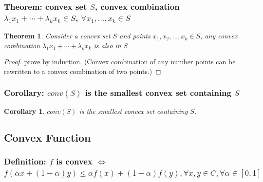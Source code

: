\documentclass[11pt,a4paper]{article}
\newtheorem{theorem}{Theorem}
\newtheorem{corollary}{Corollary}
\begin{document}
\subsubsection{Theorem: convex set $S$, convex combination $\lambda_1 x_1+\cdots+\lambda_k x_k\in S$, $\forall x_1,...,x_k\in S$}
\begin{theorem}
Consider a convex set $S$ and points $x_1,x_2,...,x_k\in S$, any convex combination $\lambda_1 x_1+\cdots+\lambda_k x_k$ is also in $S$
\end{theorem}
\begin{proof}
prove by induction. (Convex combination of any number points can be rewritten to a convex combination of two points.)
\end{proof}

\subsubsection{Corollary: $conv(S)$ is the smallest convex set containing $S$}
\begin{corollary}
    $conv(S)$ is the smallest convex set containing $S$.
\end{corollary}


\subsection{Convex Function}
\subsubsection{Definition: $f$ is convex $\Leftrightarrow$ $f(\alpha x+(1-\alpha) y) \leq \alpha f(x)+(1-\alpha) f(y), \forall x, y \in C, \forall \alpha \in[0,1]$}
\begin{center}
\end{center}
\end{document}
